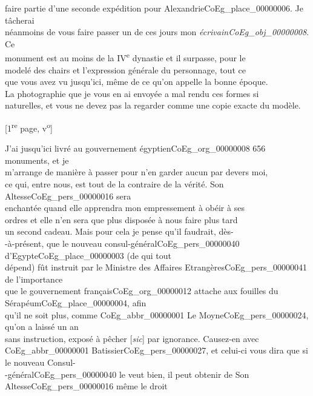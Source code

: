 \documentclass{book}
\begin{document}
faire partie d’une seconde expédition pour Alexandrie\gls{CoEg_place_00000006}. Je tâcherai\\
néanmoins de vous faire passer un de ces jours mon \textit{écrivain\gls{CoEg_obj_00000008}}. Ce\\
monument est au moins de la IV\textsuperscript{e} dynastie et il surpasse, pour le\\
modelé des chairs et l’expression générale du personnage, tout ce\\
que vous avez vu jusqu’ici, même de ce qu’on appelle la bonne époque.\\
La photographie que je vous en ai envoyée a mal rendu ces formes si\\
naturelles, et vous ne devez pas la regarder comme une copie exacte du modèle.
{\footnotesize \begin{center} {[1\textsuperscript{re} page, v\textsuperscript{o}]}\end{center}}
\indent J’ai jusqu’ici livré au gouvernement égyptien\gls{CoEg_org_00000008} 656 monuments, et je\\
m’arrange de manière à passer pour n’en garder aucun par devers moi,\\
ce qui, entre nous, est tout de la contraire de la vérité. Son Altesse\gls{CoEg_pers_00000016} sera\\
enchantée quand elle apprendra mon empressement à obéir à ses\\
ordres et elle n’en sera que plus disposée à nous faire plus tard\\
un second cadeau. Mais pour cela je pense qu’il faudrait, dès-\\
-à-présent, que le nouveau consul-général\gls{CoEg_pers_00000040} d’Egypte\gls{CoEg_place_00000003} (de qui tout\\
dépend) fût instruit par le Ministre des Affaires Etrangères\gls{CoEg_pers_00000041} de l’importance\\
que le gouvernement français\gls{CoEg_org_00000012} attache aux fouilles du Sérapéum\gls{CoEg_place_00000004}, afin\\
qu’il ne soit plus, comme \gls{CoEg_abbr_00000001} Le Moyne\gls{CoEg_pers_00000024}, qu’on a laissé un an\\
sans instruction, exposé à pêcher {[\textit{sic}]} par ignorance. Causez-en avec\\
\gls{CoEg_abbr_00000001} Batissier\gls{CoEg_pers_00000027}, et celui-ci vous dira que si le nouveau Consul-\\
-général\gls{CoEg_pers_00000040} le veut bien, il peut obtenir de Son Altesse\gls{CoEg_pers_00000016} même le droit\\
\end{document}
